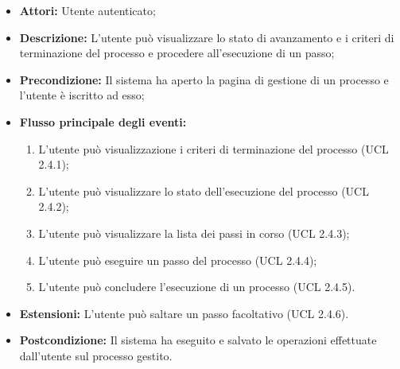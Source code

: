 \begin{itemize}
\item \textbf{Attori:} Utente autenticato;
\item \textbf{Descrizione:} L'utente può visualizzare lo stato di avanzamento e i criteri di terminazione del processo e procedere all'esecuzione di un passo;
\item \textbf{Precondizione:} Il sistema ha aperto la pagina di gestione di un processo e l'utente è iscritto ad esso;
\item \textbf{Flusso principale degli eventi:}
\begin{enumerate}
\item L'utente può visualizzazione i criteri di terminazione del processo (UCL 2.4.1);
\item L'utente può visualizzare lo stato dell'esecuzione del processo (UCL 2.4.2);
\item L'utente può visualizzare la lista dei passi in corso (UCL 2.4.3);
\item L'utente può eseguire un passo del processo (UCL 2.4.4);
\item L'utente può concludere l'esecuzione di un processo (UCL 2.4.5).
\end{enumerate} 
\item \textbf{Estensioni:} L'utente può saltare un passo facoltativo (UCL 2.4.6).
\item \textbf{Postcondizione:} Il sistema ha eseguito e salvato le operazioni effettuate dall'utente sul processo gestito.
\end{itemize}

\hypertarget{L2.4.1}{}
